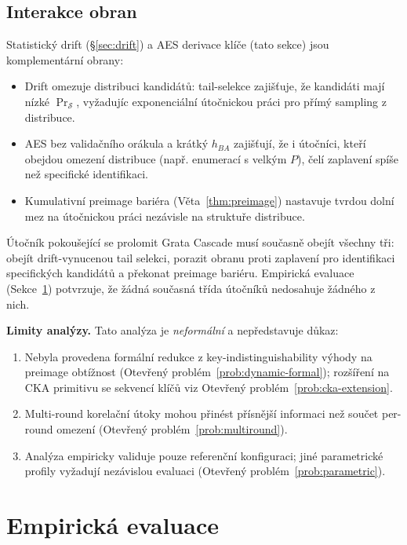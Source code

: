 \documentclass[11pt,a4paper]{article}
\begin{document}
\subsection{Interakce obran}

Statistický drift (§\ref{sec:drift}) a AES derivace klíče (tato sekce) jsou komplementární obrany:

\begin{itemize}[leftmargin=*]
\item Drift omezuje distribuci kandidátů: tail-selekce zajišťuje, že kandidáti mají nízké $\Pr_\mathcal{S}$, vyžadujíc exponenciální útočnickou práci pro přímý sampling z distribuce.
\item AES bez validačního orákula a krátký $h_{BA}$ zajišťují, že i útočníci, kteří obejdou omezení distribuce (např. enumerací s velkým $P$), čelí zaplavení spíše než specifické identifikaci.
\item Kumulativní preimage bariéra (Věta~\ref{thm:preimage}) nastavuje tvrdou dolní mez na útočnickou práci nezávisle na struktuře distribuce.
\end{itemize}

Útočník pokoušející se prolomit Grata Cascade musí současně obejít všechny tři: obejít drift-vynucenou tail selekci, porazit obranu proti zaplavení pro identifikaci specifických kandidátů a překonat preimage bariéru. Empirická evaluace (Sekce~\ref{sec:empirical}) potvrzuje, že žádná současná třída útočníků nedosahuje žádného z nich.

\textbf{Limity analýzy.} Tato analýza je \emph{neformální} a nepředstavuje důkaz:
\begin{enumerate}[leftmargin=*]
\item Nebyla provedena formální redukce z key-indistinguishability výhody na preimage obtížnost (Otevřený problém~\ref{prob:dynamic-formal}); rozšíření na CKA primitivu se sekvencí klíčů viz Otevřený problém~\ref{prob:cka-extension}.
\item Multi-round korelační útoky mohou přinést přísnější informaci než součet per-round omezení (Otevřený problém~\ref{prob:multiround}).
\item Analýza empiricky validuje pouze referenční konfiguraci; jiné parametrické profily vyžadují nezávislou evaluaci (Otevřený problém~\ref{prob:parametric}).
\end{enumerate}

\section{Empirická evaluace}\label{sec:empirical}
\end{document}
